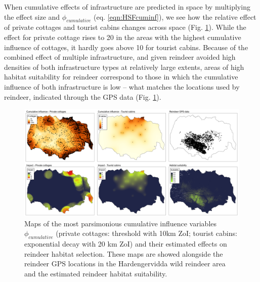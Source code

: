\documentclass[titlepage]{article}
\begin{document}
{When cumulative effects of infrastructure are predicted in space by multiplying the effect size and $\phi_{cumulative}$ (eq. \ref{eqn:HSFcuminf}), we see how the relative effect of private cottages and tourist cabins changes across space (Fig. \ref{fig:prediction_maps}). While the effect for private cottage rises to 20 in the areas with the highest cumulative influence of cottages, it hardly goes above 10 for tourist cabins. Because of the combined effect of multiple infrastructure, and given reindeer
avoided high densities of both infrastructure types at relatively large extents, 
areas of high habitat suitability for reindeer correspond to those in which the
cumulative influence of both infrastructure is low -- what matches the
locations used by reindeer, indicated through the GPS data (Fig. \ref{fig:prediction_maps}).

\begin{figure}[h]
\centering
\includegraphics[width=1.3\textwidth,center]{figures/reindeer_results_prediction_maps.png}
\caption{\label{fig:prediction_maps} Maps of the most parsimonious cumulative influence variables $\phi_{cumulative}$ (private cottages: threshold with 10km ZoI; tourist cabins: exponential decay with 20 km ZoI) and their estimated effects on reindeer habitat selection. These maps are showed alongside the reindeer GPS locations in the Hardengervidda wild reindeer area and the estimated reindeer habitat suitability.}
\end{figure}


}
\end{document}

